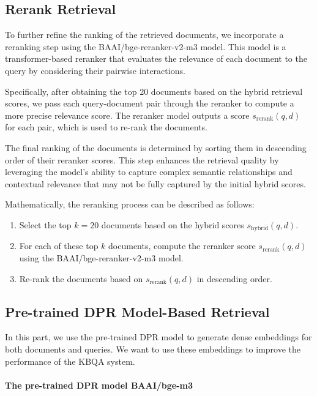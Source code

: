 \documentclass[twoside]{article}
\begin{document}
\subsection{Rerank Retrieval}

To further refine the ranking of the retrieved documents, we incorporate a reranking step using the BAAI/bge-reranker-v2-m3 model. This model is a transformer-based reranker that evaluates the relevance of each document to the query by considering their pairwise interactions.

Specifically, after obtaining the top 20 documents based on the hybrid retrieval scores, we pass each query-document pair through the reranker to compute a more precise relevance score. The reranker model outputs a score \( s_{\text{rerank}}(q, d) \) for each pair, which is used to re-rank the documents.

The final ranking of the documents is determined by sorting them in descending order of their reranker scores. This step enhances the retrieval quality by leveraging the model's ability to capture complex semantic relationships and contextual relevance that may not be fully captured by the initial hybrid scores.

Mathematically, the reranking process can be described as follows:

\begin{enumerate}
    \item Select the top \( k = 20 \) documents based on the hybrid scores \( s_{\text{hybrid}}(q, d) \).
    \item For each of these top \( k \) documents, compute the reranker score \( s_{\text{rerank}}(q, d) \) using the BAAI/bge-reranker-v2-m3 model.
    \item Re-rank the documents based on \( s_{\text{rerank}}(q, d) \) in descending order.
\end{enumerate}


\subsection{Pre-trained DPR Model-Based Retrieval}
In this part, we use the pre-trained DPR model to generate dense embeddings for both documents and queries. We want to use these embeddings to improve 
the performance of the KBQA system.

\paragraph*{The pre-trained DPR model BAAI/bge-m3}
\end{document}
